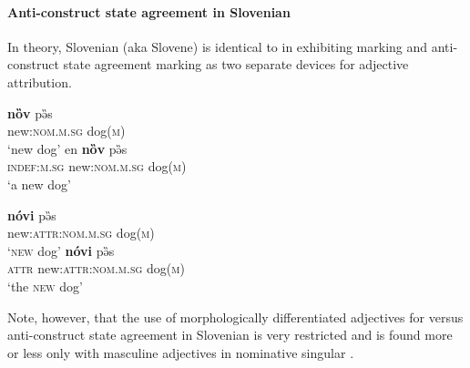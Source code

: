 \paragraph*{Anti\hyp{}construct state agreement in Slovenian}
\label{slovenian synchr}
In theory, Slovenian (aka Slovene) is identical to  in exhibiting  marking and anti\hyp{}construct state agreement marking as two separate devices for adjective attribution.
\begin{exe}
\label{slov longshort}
\begin{xlist}
\begin{xlist}
\ex
\gll 	\textbf{nȍv} pə̏s\\
	new:\textsc{nom.m.sg} dog\textsc{(m)}\\
\glt	‘new dog’
\ex	
\gll	en \textbf{nȍv} pə̏s\\
	\textsc{indef:m.sg} new:\textsc{nom.m.sg} dog\textsc{(m)}\\
\glt	‘a new dog’
\end{xlist}
\begin{xlist}
\ex	
\gll	\textbf{nóvi} pə̏s\\
	new:\textsc{attr:nom.m.sg} dog\textsc{(m)}\\
\glt	‘\textsc{new} dog’
\ex
{} \textbf{nóvi} pə̏s\\
	{\textsc{attr}} new:\textsc{attr:nom.m.sg} dog\textsc{(m)}\\
\glt	 ‘the \textsc{new} dog’
\end{xlist}
\end{xlist}
\end{exe}
Note, however, that the use of morphologically differentiated adjectives for  versus anti\hyp{}construct state agreement in Slovenian is very restricted and is found more or less only with masculine adjectives in nominative singular \citep[410–411]{priestly1993}.


